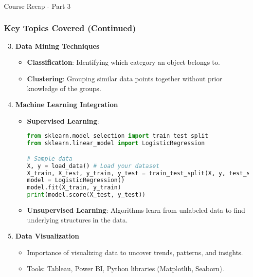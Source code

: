 \documentclass[aspectratio=169]{beamer}
\begin{document}
\begin{frame}[fragile]{Course Recap - Part 3}
    \frametitle{Key Topics Covered (Continued)}

    \begin{enumerate}\setcounter{enumi}{2}
        \item \textbf{Data Mining Techniques}
            \begin{itemize}
                \item \textbf{Classification}: Identifying which category an object belongs to.
                \item \textbf{Clustering}: Grouping similar data points together without prior knowledge of the groups.
            \end{itemize}

        \item \textbf{Machine Learning Integration}
            \begin{itemize}
                \item \textbf{Supervised Learning}:
                \begin{lstlisting}[language=Python]
from sklearn.model_selection import train_test_split
from sklearn.linear_model import LogisticRegression

# Sample data
X, y = load_data() # Load your dataset
X_train, X_test, y_train, y_test = train_test_split(X, y, test_size=0.2)
model = LogisticRegression()
model.fit(X_train, y_train)
print(model.score(X_test, y_test))
                \end{lstlisting}

                \item \textbf{Unsupervised Learning}: Algorithms learn from unlabeled data to find underlying structures in the data.
            \end{itemize}
    
        \item \textbf{Data Visualization}
            \begin{itemize}
                \item Importance of visualizing data to uncover trends, patterns, and insights.
                \item Tools: Tableau, Power BI, Python libraries (Matplotlib, Seaborn).
            \end{itemize}
    \end{enumerate}
\end{frame}
\end{document}
